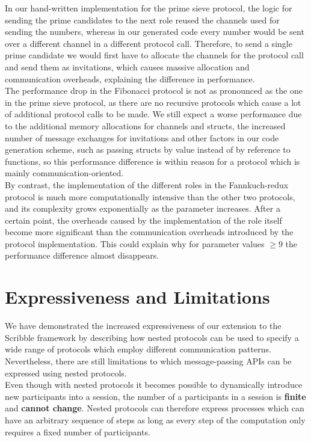 \documentclass[12pt,twoside]{report}
\begin{document}
In our hand-written implementation for the prime sieve protocol, the logic for sending the prime candidates to the next role reused the channels used for sending the numbers, whereas in our generated code every number would be sent over a different channel in a different protocol call. Therefore, to send a single prime candidate we would first have to allocate the channels for the protocol call and send them as invitations, which causes massive allocation and communication overheads, explaining the difference in performance. \\

The performance drop in the Fibonacci protocol is not as pronounced as the one in the prime sieve protocol, as there are no recursive protocols which cause a lot of additional protocol calls to be made. We still expect a worse performance due to the additional memory allocations for channels and structs, the increased number of message exchanges for invitations and other factors in our code generation scheme, such as passing structs by value instead of by reference to functions, so this performance difference is within reason for a protocol which is mainly communication-oriented.\\

By contrast, the implementation of the different roles in the Fannkuch-redux protocol is much more computationally intensive than the other two protocols, and its complexity grows exponentially as the parameter increases. After a certain point, the overheads caused by the implementation of the role itself become more significant than the communication overheads introduced by the protocol implementation. This could explain why for parameter values $\geq 9$ the performance difference almost disappears.

\section{Expressiveness and Limitations}

We have demonstrated the increased expressiveness of our extension to the Scribble framework by describing how nested protocols can be used to specify a wide range of protocols which employ different communication patterns. Nevertheless, there are still limitations to which message-passing APIs can be expressed using nested protocols.\\

Even though with nested protocols it becomes possible to dynamically introduce new participants into a session, the number of a participants in a session is \textbf{finite} and \textbf{cannot change}. Nested protocols can therefore express processes which can have an arbitrary sequence of steps as long as every step of the computation only requires a fixed number of participants. \\
\end{document}
